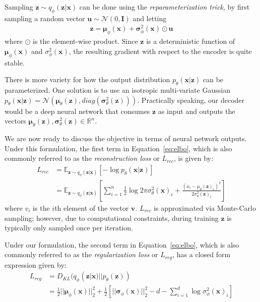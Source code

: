 \documentclass{article}
\begin{document}
Sampling  $\mathbf{z} \sim q_\phi(\mathbf{z}|\mathbf{x})$ can be done using the \emph{reparameterization trick}, by first sampling a random vector $\mathbf{u} \sim \mathcal{N}(0,\mathbf{I})$ and letting 
\begin{align}
    \mathbf{z} = \boldsymbol \mu_\phi(\mathbf{x}) + \boldsymbol \sigma^2_\phi(\mathbf{x}) \odot \mathbf{u} \label{eq:reparameterize}
\end{align}
where $\odot$ is the element-wise product. Since $\mathbf{z}$ is a deterministic function of  $ \boldsymbol \mu_\phi(\mathbf{x})$ and $\sigma^2_\phi(\mathbf{x})$, the resulting gradient with respect to the encoder is quite stable.

There is more variety for how the output distribution $p_\theta(\mathbf{x}|\mathbf{z})$ can be parameterized. One solution is to use an isotropic multi-variate Gaussian $p_\theta(\mathbf{x}|\mathbf{z}) = \mathcal{N}(\boldsymbol \mu_\theta(\mathbf{z}), diag(\boldsymbol \sigma^2_\theta(\mathbf{z})) )$.
Practically speaking, our decoder would be a deep neural network that consumes $\mathbf{z}$ as input and outputs the vectors 
$\boldsymbol \mu_\theta(\mathbf{z}), \boldsymbol \sigma^2_\theta(\mathbf{z}) \in \mathbb{R}^n$.

We are now ready to discuss the objective in terms of neural network outputs.
Under this formulation, the first term in Equation~\ref{eq:elbo}, which is also commonly referred to as the \emph{reconstruction loss} or $L_{rec}$, is given by:
\begin{align}
    L_{rec} &= \mathbb{E}_{\mathbf{z} \sim  q_\phi(\mathbf{z}|\mathbf{x})}[- \log p_\theta(\mathbf{x}| \mathbf{z})] \\
     &= \mathbb{E}_{\mathbf{z} \sim  q_\phi(\mathbf{z}|\mathbf{x})}[
     \sum_{i=1}^n \frac{1}{2}\log 2\pi \sigma^2_\theta(\mathbf{x})_i + \frac{(x_i - \mu_\theta(\mathbf{z})_i)^2}{2\sigma^2_\theta(\mathbf{z})_i}]
     \label{eq:reconloss}
\end{align}
where $v_i$ is the $i$th element of the vector $\mathbf{v}$.
$L_{rec}$ is approximated via Monte-Carlo sampling; however, due to computational constraints, during training $\mathbf{z}$ is typically only sampled once per iteration.


Under our formulation, the second term in Equation~\ref{eq:elbo}, which is also commonly referred to as the \emph{regularization loss} or $L_{reg}$, has a closed form expression given by:
\begin{align}
     L_{reg} &=  D_{KL}(q_\phi(\mathbf{z}|\mathbf{x}) || p_\theta(\mathbf{z})) \\
     &= \frac{1}{2} ||\boldsymbol \mu_\phi(\mathbf{x})||_2^2 + \frac{1}{2} [ ||\boldsymbol \sigma_\phi(\mathbf{x}) ||_2^2 - d - \sum_{i=1}^d \log \sigma^2_{\phi}(\mathbf{x})_i] \label{eq:regloss}
\end{align}
\end{document}
